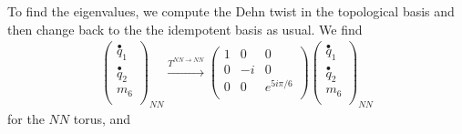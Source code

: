 To find the eigenvalues, we compute the Dehn twist in the topological basis and then change back to the 
the idempotent basis as usual. 
We find
\begin{align}
\left( \begin{matrix}
\stackrel{\bullet}{q}_{1}\\
\stackrel{\bullet}{q}_{2}\\
{m}_6 \\ 
\end{matrix} \right)_{NN} \xrightarrow{T^{NN\rightarrow NN}}
\left( \begin{matrix} 
1 & 0&0 \\
0 & -i & 0 \\
0 & 0& e^{5 i \pi /6}\\
\end{matrix} \right) 
\left( \begin{matrix}
\stackrel{\bullet}{q}_{1}\\
\stackrel{\bullet}{q}_{2}\\
{m}_6 \\ 
\end{matrix} \right)_{NN}
\end{align}
for the $NN$ torus, and 
